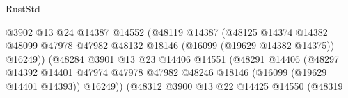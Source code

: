 \begin{lexlean}{RustStd}
\begin{coremodule}
                                                    @3902
                                                    @13
                                                    @24
                                                    @14387
                                                    @14552
                                                    (@48119
                                                      @14387
                                                      (@48125
                                                        @14374
                                                        @14382
                                                        @48099
                                                        @47978
                                                        @47982
                                                        @48132
                                                        @18146
                                                        (@16099 (@19629 @14382 @14375))
                                                        @16249))
                                                    (@48284
                                                      @3901
                                                      @13
                                                      @23
                                                      @14406
                                                      @14551
                                                      (@48291
                                                        @14406
                                                        (@48297
                                                          @14392
                                                          @14401
                                                          @47974
                                                          @47978
                                                          @47982
                                                          @48246
                                                          @18146
                                                          (@16099 (@19629 @14401 @14393))
                                                          @16249))
                                                      (@48312
                                                        @3900
                                                        @13
                                                        @22
                                                        @14425
                                                        @14550
                                                        (@48319

\end{coremodule}
\end{lexlean}
